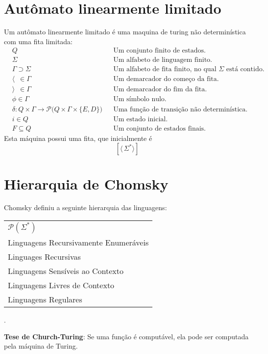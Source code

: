 \documentclass[11pt]{article}
\begin{document}
\section{Autômato linearmente limitado}
\label{sec:org62c8211}
Um autômato linearmente limitado é uma maquina de turing não determinística com uma fita
limitada:
\begin{align*}
  & Q && \text{Um conjunto finito de estados.} \\
  & \Sigma && \text{Um alfabeto de linguagem finito.} \\
  & \Gamma \supset \Sigma && \text{Um alfabeto de fita finito, no qual $\Sigma$ está contido.} \\
  & \langle \enspace \in \Gamma && \text{Um demarcador do começo da fita.} \\
  & \rangle \enspace \in \Gamma && \text{Um demarcador do fim da fita.} \\
  & \phi \in \Gamma && \text{Um símbolo nulo.} \\
  & \delta: Q \times \Gamma \to \mathcal{P}\big(Q \times \Gamma \times \{E, D\}\big) && \text{Uma função de transição não determinística.} \\
  & i \in Q && \text{Um estado inicial.} \\
  & F \subseteq Q && \text{Um conjunto de estados finais.}
\end{align*}
Esta máquina possui uma fita, que inicialmente é
\[
  \left[\langle\,\Sigma^* \rangle\right]
\]
\section{Hierarquia de Chomsky}
\label{sec:orgae4a1ba}
Chomsky definiu a seguinte hierarquia das linguagens:
\begin{table}[H]
  \centering
  \left\downarrow
  \begin{tabular}{l}
    $\mathcal{P}(\Sigma^*)$ \\
    Linguagens Recursivamente Enumeráveis \\
    Linguages Recursivas \\
    Linguagens Sensíveis ao Contexto \\
    Linguagens Livres de Contexto \\
    Linguagens Regulares
  \end{tabular}
  \right.
\end{table}
\textbf{Tese de Church-Turing}: Se uma função é computável, ela pode ser computada pela máquina
de Turing.
\end{document}
